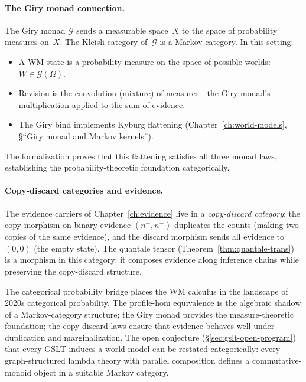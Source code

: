 \paragraph{The Giry monad connection.}
The Giry monad $\mathcal{G}$ sends a measurable space~$X$ to the
space of probability measures on~$X$.  The Kleisli category of~$\mathcal{G}$
is a Markov category.  In this setting:
\begin{itemize}
\item A WM state is a probability measure on the space of possible
  worlds: $W \in \mathcal{G}(\Omega)$.
\item Revision is the convolution (mixture) of measures---the Giry
  monad's multiplication applied to the sum of evidence.
\item The Giry bind implements Kyburg flattening
  (Chapter~\ref{ch:world-models}, \S``Giry monad and Markov
  kernels'').
\end{itemize}
The formalization proves that this flattening satisfies all three
monad laws, establishing the probability-theoretic foundation
categorically.

\paragraph{Copy-discard categories and evidence.}
The evidence carriers of Chapter~\ref{ch:evidence} live in a
\emph{copy-discard category}: the copy morphism on binary evidence
$(n^+, n^-)$ duplicates the counts (making two copies of the same
evidence), and the discard morphism sends all evidence to $(0, 0)$
(the empty state).  The quantale tensor
(Theorem~\ref{thm:quantale-trans}) is a morphism in this category:
it composes evidence along inference chains while preserving the
copy-discard structure.

\begin{remark}
The categorical probability bridge places the WM calculus in the
landscape of 2020s categorical probability.  The profile-hom
equivalence is the algebraic shadow of a Markov-category structure;
the Giry monad provides the measure-theoretic foundation; the
copy-discard laws ensure that evidence behaves well under duplication
and marginalization.  The open conjecture
(\S\ref{sec:gslt-open-program}) that every GSLT induces a world
model can be restated categorically: every graph-structured lambda
theory with parallel composition defines a commutative-monoid
object in a suitable Markov category.
\end{remark}



